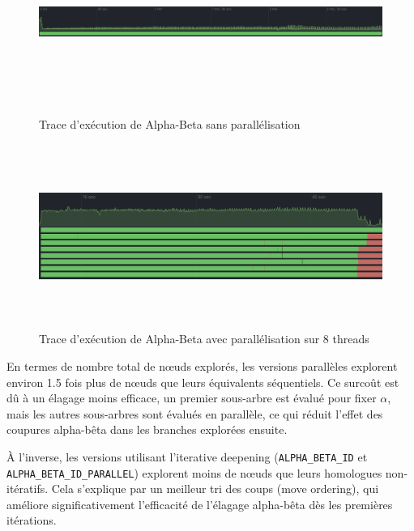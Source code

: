 \documentclass{article}
\begin{document}
\begin{figure}[h]
    \centering
    \includegraphics[width=\textwidth,height=6.0cm,keepaspectratio]{without_parallel.png}
    \caption{Trace d'exécution de Alpha-Beta sans parallélisation}
    \label{no_parallel_trace}
\end{figure}

\begin{figure}[h]
    \centering
    \includegraphics[width=\textwidth,height=6.0cm,keepaspectratio]{with_parallel.png}
    \caption{Trace d'exécution de Alpha-Beta avec parallélisation sur 8 threads}
    \label{parallel_trace}
\end{figure}
\FloatBarrier

En termes de nombre total de nœuds explorés, les versions parallèles explorent environ 1.5 fois plus de nœuds que leurs équivalents séquentiels. Ce surcoût est dû à un élagage moins efficace, un premier sous-arbre est évalué pour fixer $\alpha$, mais les autres sous-arbres sont évalués en parallèle, ce qui réduit l'effet des coupures alpha-bêta dans les branches explorées ensuite.

À l'inverse, les versions utilisant l'iterative deepening (\texttt{ALPHA\_BETA\_ID} et \texttt{ALPHA\_BETA\_ID\_PARALLEL}) explorent moins de nœuds que leurs homologues non-itératifs. Cela s'explique par un meilleur tri des coups (move ordering), qui améliore significativement l'efficacité de l'élagage alpha-bêta dès les premières itérations.
\end{document}
